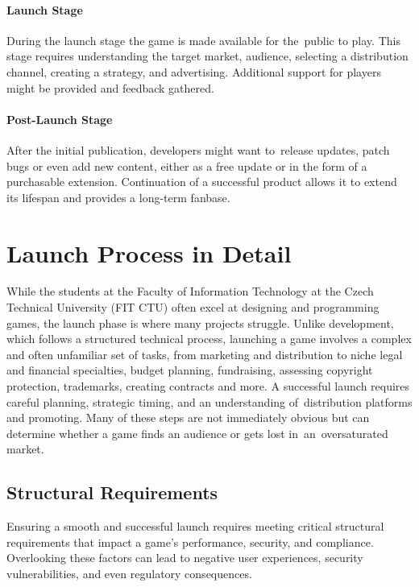 \paragraph{Launch Stage}
During the launch stage the game is made available for the~public to play. This stage requires understanding the target market, audience, selecting a distribution channel, creating a strategy, and advertising. Additional support for players might be provided and feedback gathered.
\cite{bramble_7-stages, rocket_6-stages, esler_viable-games}

\paragraph{Post-Launch Stage}
After the initial publication, developers might want to~release updates, patch bugs or even add new content, either as a free update or in the form of a purchasable extension. Continuation of a successful product allows it to extend its lifespan and provides a long-term fanbase.
\cite{bramble_7-stages, rocket_6-stages}

\section{Launch Process in Detail}
While the students at the Faculty of Information Technology at the Czech Technical University (FIT CTU) often excel at designing and programming games, the launch phase is where many projects struggle. Unlike development, which follows a structured technical process, launching a game involves a complex and often unfamiliar set of tasks, from marketing and distribution to niche legal and financial specialties, budget planning, fundraising, assessing copyright protection, trademarks, creating contracts and more. A successful launch requires careful planning, strategic timing, and an understanding of~distribution platforms and promoting. Many of these steps are not immediately obvious but can determine whether a game finds an audience or gets lost in~an~oversaturated market.

\subsection{Structural Requirements}
Ensuring a smooth and successful launch requires meeting critical structural requirements that impact a game’s performance, security, and compliance. Overlooking these factors can lead to negative user experiences, security vulnerabilities, and even regulatory consequences.

